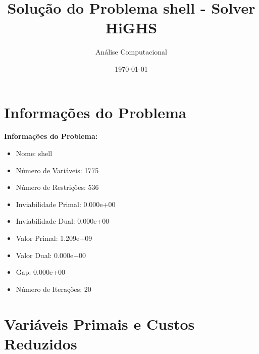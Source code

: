 \documentclass[12pt]{article}
\title{Solução do Problema shell - Solver HiGHS}
\author{Análise Computacional}
\date{\today}
\begin{document}
\maketitle

\section{Informações do Problema}

\textbf{Informações do Problema:}
\begin{itemize}
\item Nome: shell
\item Número de Variáveis: 1775
\item Número de Restrições: 536
\item Inviabilidade Primal: 0.000e+00
\item Inviabilidade Dual: 0.000e+00
\item Valor Primal: 1.209e+09
\item Valor Dual: 0.000e+00
\item Gap: 0.000e+00
\item Número de Iterações: 20
\end{itemize}


\section{Variáveis Primais e Custos Reduzidos}
\end{document}
